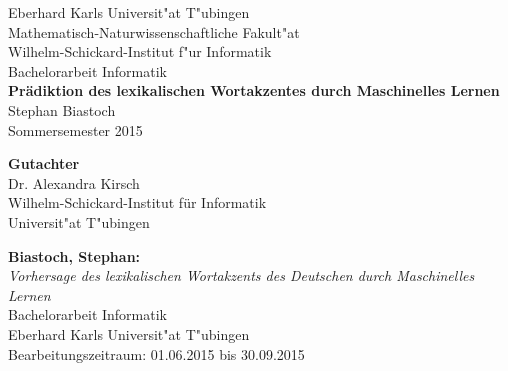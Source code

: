 \documentclass[twoside,12pt,a4paper]{report}
\begin{document}
 
\begin{titlepage}
 \begin{center}
  {\LARGE Eberhard Karls Universit"at T"ubingen}\\
  {\large Mathematisch-Naturwissenschaftliche Fakult"at \\
Wilhelm-Schickard-Institut f"ur Informatik\\[4cm]}
  {\huge Bachelorarbeit Informatik\\[2cm]}
  {\Large\bf Prädiktion des lexikalischen Wortakzentes durch Maschinelles Lernen\\[1.5cm]}
 {\large Stephan Biastoch}\\[0.5cm]
Sommersemester 2015\\[5cm]
\begin{center}{\small\bf Gutachter}\\[0.5cm]
{\large Dr. Alexandra Kirsch}\\
  {\footnotesize Wilhelm-Schickard-Institut f\"ur Informatik\\%
	Universit"at T"ubingen}	\end{center}
	

  \end{center}
\end{titlepage}



\thispagestyle{empty}
\vspace*{\fill}
\begin{minipage}{11.2cm}
\textbf{Biastoch, Stephan:}\\
\emph{Vorhersage des lexikalischen Wortakzents des Deutschen durch Maschinelles Lernen}\\ Bachelorarbeit Informatik\\
Eberhard Karls Universit"at T"ubingen\\
Bearbeitungszeitraum: 01.06.2015 bis 30.09.2015
\end{minipage}
\newpage
\end{document}
